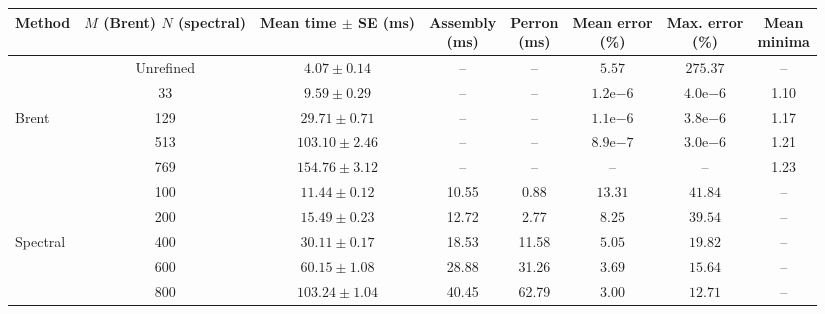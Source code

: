 \begin{table}[htbp]
    \centering
    \footnotesize
    \setlength{\tabcolsep}{3pt}
    \begin{tabular}{lccccccc}
        \toprule
        Method & \shortstack{$M$ (Brent)\\$N$ (spectral)}
        & \shortstack{Mean time\\$\pm$ SE (ms)}
        & \shortstack{Assembly\\(ms)}
        & \shortstack{Perron\\(ms)}
        & \shortstack{Mean error\\(\%)}
        & \shortstack{Max. error\\(\%)}
        & \shortstack{Mean\\minima} \\
        \midrule
        & Unrefined
        & $4.07 \pm 0.14$ & -- & --
        & $5.57$ & $275.37$ & -- \\
        & 33
        & $9.59 \pm 0.29$ & -- & --
        & $1.2\mathrm{e}{-6}$ & $4.0\mathrm{e}{-6}$ & 1.10 \\
        Brent & 129
        & $29.71 \pm 0.71$ & -- & --
        & $1.1\mathrm{e}{-6}$ & $3.8\mathrm{e}{-6}$ & 1.17 \\
        & 513
        & $103.10 \pm 2.46$ & -- & --
        & $8.9\mathrm{e}{-7}$ & $3.0\mathrm{e}{-6}$ & 1.21 \\
        & 769
        & $154.76 \pm 3.12$ & -- & --
        & -- & -- & 1.23 \\
        \midrule
        & 100
        & $11.44 \pm 0.12$ & 10.55 & 0.88
        & $13.31$ & $41.84$ & -- \\
        & 200
        & $15.49 \pm 0.23$ & 12.72 & 2.77
        & $8.25$ & $39.54$ & -- \\
        Spectral & 400
        & $30.11 \pm 0.17$ & 18.53 & 11.58
        & $5.05$ & $19.82$ & -- \\
        & 600
        & $60.15 \pm 1.08$ & 28.88 & 31.26
        & $3.69$ & $15.64$ & -- \\
        & 800
        & $103.24 \pm 1.04$ & 40.45 & 62.79
        & $3.00$ & $12.71$ & -- \\
        \bottomrule
    \end{tabular}
\end{table}
